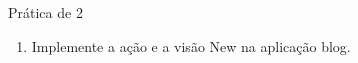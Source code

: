 \begin{frame}{Prática de 2}
	\begin{enumerate}
		\item Implemente a ação e a visão New na aplicação blog.
	\end{enumerate}
\end{frame}